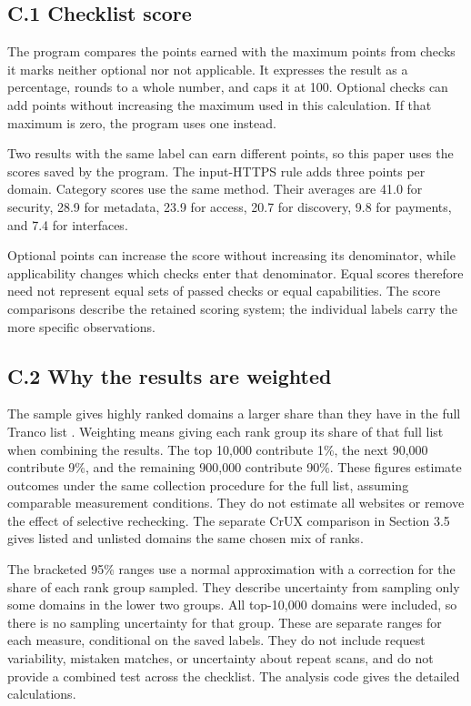 \documentclass{article}
\begin{document}
\subsection*{C.1 Checklist score}

The program compares the points earned with the maximum points from checks it marks neither optional nor not applicable. It expresses the result as a percentage, rounds to a whole number, and caps it at 100. Optional checks can add points without increasing the maximum used in this calculation. If that maximum is zero, the program uses one instead.

Two results with the same label can earn different points, so this paper uses the scores saved by the program. The input-HTTPS rule adds three points per domain. Category scores use the same method. Their averages are 41.0 for security, 28.9 for metadata, 23.9 for access, 20.7 for discovery, 9.8 for payments, and 7.4 for interfaces.

Optional points can increase the score without increasing its denominator, while applicability changes which checks enter that denominator. Equal scores therefore need not represent equal sets of passed checks or equal capabilities. The score comparisons describe the retained scoring system; the individual labels carry the more specific observations.

\subsection*{C.2 Why the results are weighted}

The sample gives highly ranked domains a larger share than they have in the full Tranco list \cite{ref1}. Weighting means giving each rank group its share of that full list when combining the results. The top 10,000 contribute 1\%, the next 90,000 contribute 9\%, and the remaining 900,000 contribute 90\%. These figures estimate outcomes under the same collection procedure for the full list, assuming comparable measurement conditions. They do not estimate all websites or remove the effect of selective rechecking. The separate CrUX comparison in Section 3.5 gives listed and unlisted domains the same chosen mix of ranks.

The bracketed 95\% ranges use a normal approximation with a correction for the share of each rank group sampled. They describe uncertainty from sampling only some domains in the lower two groups. All top-10,000 domains were included, so there is no sampling uncertainty for that group. These are separate ranges for each measure, conditional on the saved labels. They do not include request variability, mistaken matches, or uncertainty about repeat scans, and do not provide a combined test across the checklist. The analysis code gives the detailed calculations.
\end{document}
